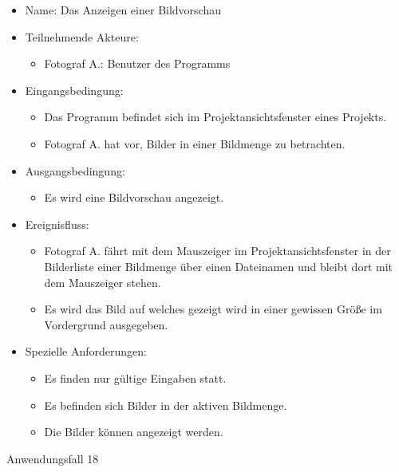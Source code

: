 	\begin{itemize}
		\item Name: Das Anzeigen einer Bildvorschau
		\item Teilnehmende Akteure:
		\begin{itemize}
			\item	Fotograf A.: Benutzer des Programms		
		\end{itemize}
		\item Eingangsbedingung:
		\begin{itemize}
			\item	Das Programm befindet sich im Projektansichtsfenster eines Projekts.
			\item Fotograf A. hat vor, Bilder in einer Bildmenge zu betrachten.
		\end{itemize}
		\item Ausgangsbedingung:
		\begin{itemize}
			\item	Es wird eine Bildvorschau angezeigt.	
		\end{itemize}
		\item Ereignisfluss:
		\begin{itemize}
			\item Fotograf A. fährt mit dem Mauszeiger im Projektansichtsfenster in der Bilderliste einer Bildmenge über einen Dateinamen und bleibt dort mit dem Mauszeiger stehen.
			\item Es wird das Bild auf welches gezeigt wird in einer gewissen Größe im Vordergrund ausgegeben.
		\end{itemize}
		\item Spezielle Anforderungen:
		\begin{itemize}
			\item	Es finden nur gültige Eingaben statt.
			\item Es befinden sich Bilder in der aktiven Bildmenge.
			\item Die Bilder können angezeigt werden.			
		\end{itemize}			
	\end{itemize}
	
	\begin{description}
		\item[Anwendungsfall 18]
	\end{description}
	
